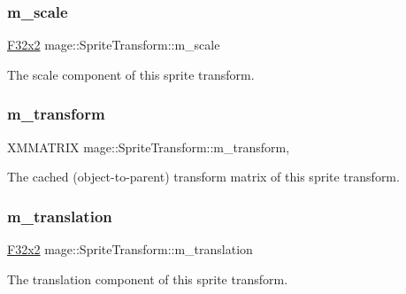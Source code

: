 \subsubsection{\texorpdfstring{m\+\_\+scale}{m\_scale}}
{\footnotesize\ttfamily \hyperlink{namespacemage_aa87237ad091f5cd7da612b8523fc108f}{F32x2} mage\+::\+Sprite\+Transform\+::m\+\_\+scale\hspace{0.3cm}{\ttfamily [private]}}

The scale component of this sprite transform. \hypertarget{classmage_1_1_sprite_transform_ad2fec50a82772514da9399ff31703f3d}{}\label{classmage_1_1_sprite_transform_ad2fec50a82772514da9399ff31703f3d} 
\subsubsection{\texorpdfstring{m\+\_\+transform}{m\_transform}}
{\footnotesize\ttfamily X\+M\+M\+A\+T\+R\+IX mage\+::\+Sprite\+Transform\+::m\+\_\+transform\hspace{0.3cm}{\ttfamily [mutable]}, {\ttfamily [private]}}

The cached (object-\/to-\/parent) transform matrix of this sprite transform. \hypertarget{classmage_1_1_sprite_transform_a4006065eb65336fceffa36a5c2c45e59}{}\label{classmage_1_1_sprite_transform_a4006065eb65336fceffa36a5c2c45e59} 
\subsubsection{\texorpdfstring{m\+\_\+translation}{m\_translation}}
{\footnotesize\ttfamily \hyperlink{namespacemage_aa87237ad091f5cd7da612b8523fc108f}{F32x2} mage\+::\+Sprite\+Transform\+::m\+\_\+translation\hspace{0.3cm}{\ttfamily [private]}}

The translation component of this sprite transform. 